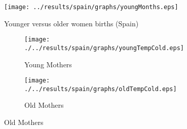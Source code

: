 
\begin{figure}[htpb!]
\centering
\caption{Younger versus older women births (Spain)}
\label{bqFig:YoungvOldSpain}
  \centering
  \texttt{[image: ../results/spain/graphs/youngMonths.eps]}
\end{figure}


\begin{figure}[htpb!]
\begin{center}
\caption{Temperature and Good Quarter (Spain)}
\label{fig:tempSpain}
\begin{subfigure}{.5\textwidth}
  \centering
  \texttt{[image: ./../results/spain/graphs/youngTempCold.eps]}
  \caption{Young Mothers}
  \label{fig:tempSpainYoung}
\end{subfigure}%
\begin{subfigure}{.5\textwidth}
  \centering
  \texttt{[image: ./../results/spain/graphs/oldTempCold.eps]}
  \caption{Old Mothers}
  \label{fig:tempSpainOld}
\end{subfigure}
\end{center}
\end{figure}
